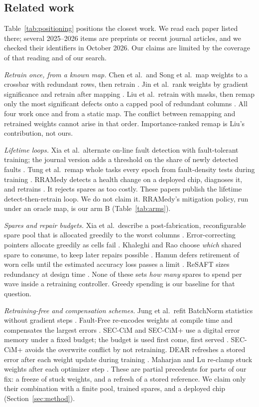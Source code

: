\documentclass[journal]{IEEEtran}
\begin{document}
\subsection{Related work}
Table~\ref{tab:positioning} positions the closest work.
We read each paper listed there; several 2025--2026 items are preprints or recent journal articles, and we checked their identifiers in October 2026.
Our claims are limited by the coverage of that reading and of our search.

\emph{Retrain once, from a known map.}
Chen et al.\ and Song et al.\ map weights to a crossbar with redundant rows, then retrain \cite{chen17date,song21ittrna}.
Jin et al.\ rank weights by gradient significance and retrain after mapping \cite{jin20date}.
Liu et al.\ retrain with masks, then remap only the most significant defects onto a capped pool of redundant columns \cite{liu17dac}.
All four work once and from a static map.
The conflict between remapping and retrained weights cannot arise in that order.
Importance-ranked remap is Liu's contribution, not ours.

\emph{Lifetime loops.}
Xia et al.\ alternate on-line fault detection with fault-tolerant training; the journal version adds a threshold on the share of newly detected faults \cite{xia17dac,xia19tcad}.
Tung et al.\ remap whole tasks every epoch from fault-density tests during training \cite{tung23date}.
RRAMedy detects a health change on a deployed chip, diagnoses it, and retrains \cite{li19rramedy,li22tc}.
It rejects spares as too costly.
These papers publish the lifetime detect-then-retrain loop.
We do not claim it.
RRAMedy's mitigation policy, run under an oracle map, is our arm B (Table~\ref{tab:arms}).

\emph{Spares and repair budgets.}
Xia et al.\ describe a post-fabrication, reconfigurable spare pool that is allocated greedily to the worst columns \cite{xia18jetcas}.
Error-correcting pointers allocate greedily as cells fail \cite{schechter10ecp}.
Khaleghi and Rao choose \emph{which} shared spare to consume, to keep later repairs possible \cite{khaleghi18}.
Hamun defers retirement of worn cells until the estimated accuracy loss passes a limit \cite{sabri25hamun}.
ReSAFT sizes redundancy at design time \cite{dorostkar26resaft}.
None of these sets \emph{how many} spares to spend per wave inside a retraining controller.
Greedy spending is our baseline for that question.

\emph{Retraining-free and compensation schemes.}
Jung et al.\ refit BatchNorm statistics without gradient steps \cite{jung21date}.
Fault-Free re-encodes weights at compile time and compensates the largest errors \cite{shin21dac}.
SEC-CiM and SEC-CiM+ use a digital error memory under a fixed budget; the budget is used first come, first served \cite{bommana24itc,bommana26todaes}.
SEC-CiM+ avoids the overwrite conflict by not retraining.
DEAR refreshes a stored error after each weight update during training \cite{bommana25dear}.
Maharjan and Lu re-clamp stuck weights after each optimizer step \cite{maharjan26isqed}.
These are partial precedents for parts of our fix: a freeze of stuck weights, and a refresh of a stored reference.
We claim only their combination with a finite pool, trained spares, and a deployed chip (Section~\ref{sec:method}).
\end{document}
